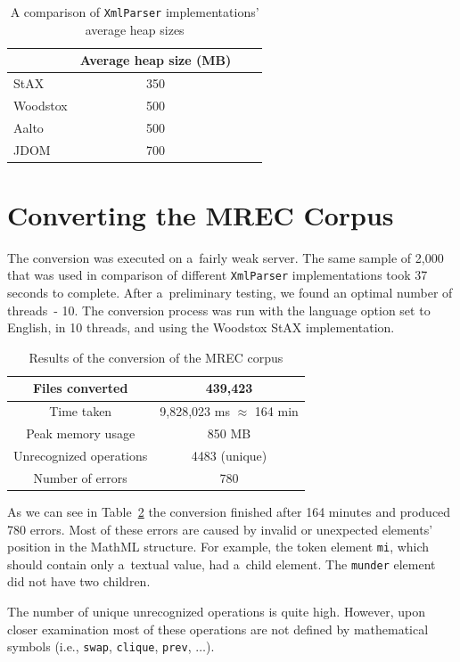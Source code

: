 \documentclass[11pt,oneside,final]{fithesis2}
\begin{document}
\begin{table}[!ht]
\centering
\begin{tabular}{|l|c|c|c|}
\hline
& Average heap size (MB) \\ \hline
\hline
StAX & 350 \\ \hline
Woodstox & 500 \\ \hline
Aalto & 500 \\ \hline
JDOM & 700 \\ \hline
\end{tabular}
\caption{A comparison of \texttt{XmlParser} implementations' average heap sizes}
\label{table:averageheap}
\end{table}

\section{Converting the MREC Corpus}
The conversion was executed on a~fairly weak server. The same sample of 2,000 that was used in comparison of different \texttt{XmlParser} implementations took 37 seconds to complete. After a~preliminary testing, we found an optimal number of threads~- 10. The conversion process was run with the language option set to English, in 10 threads, and using the Woodstox StAX implementation.

\begin{table}[!ht]
\centering
\begin{tabular}{|c|c|}
\hline
Files converted & 439,423 \\ \hline
Time taken & 9,828,023 ms $\approx$ 164 min \\ \hline
Peak memory usage & 850 MB \\ \hline
Unrecognized operations & 4483 (unique) \\ \hline
Number of errors & 780 \\ \hline
\end{tabular}
\caption{Results of the conversion of the MREC corpus}
\label{table:mrecresults}
\end{table}

As we can see in Table~\ref{table:mrecresults} the conversion finished after 164 minutes and produced 780 errors. Most of these errors are caused by invalid or unexpected elements' position in the MathML structure. For example, the token element \texttt{mi}, which should contain only a~textual value, had a~child element. The \texttt{munder} element did not have two children.

The number of unique unrecognized operations is quite high. However, upon closer examination most of these operations are not defined by mathematical symbols (i.e., \texttt{swap}, \texttt{clique}, \texttt{prev}, $\ldots$). 
\end{document}
